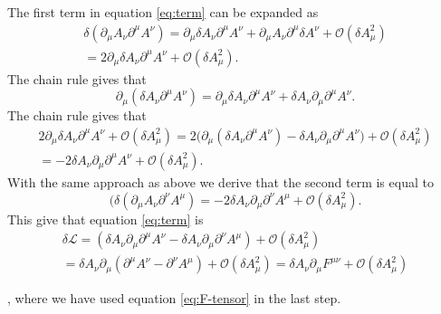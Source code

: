 The first term in equation \ref{eq:term} can be expanded as 
\begin{gather*}
\delta(\partial_\mu A_\nu \partial^\mu A^\nu)=\partial_\mu \delta A_\nu \partial^\mu A^\nu+ \partial_\mu A_\nu \partial^\mu \delta A^\nu+ \mathcal{O}(\delta A^2_\mu)\\=2\partial_\mu \delta A_\nu \partial^\mu A^\nu+\mathcal{O}(\delta A^2_\mu).
\label{eq:delta}
\end{gather*}
The chain rule gives that 
\[
\partial _\mu (\delta A_\nu \partial ^\mu A^\nu)= \partial_\mu \delta A_\nu \partial^\mu A^\nu +  \delta A_\nu \partial_\mu \partial^\mu A^\nu
. 
\]
The chain rule gives that
\begin{gather*}
2\partial_\mu \delta A_\nu \partial^\mu A^\nu+\mathcal{O}(\delta A^2_\mu)=2\big(\partial _\mu (\delta A_\nu \partial ^\mu A^\nu)-\delta A_\nu \partial_\mu \partial^\mu A^\nu\big)+\mathcal{O}(\delta A^2_\mu)\\=-2 \delta A_\nu \partial_\mu \partial^\mu A^\nu +\mathcal{O}(\delta A^2_\mu).
\end{gather*}
With the same approach as above we derive that the second term is equal to
\[
(\delta(\partial_\mu A_\nu \partial^\nu A^\mu)=-2 \delta A_\nu \partial_\mu \partial ^\nu A^\mu +  \mathcal{O}(\delta A^2_\mu).
\]
This give that equation \ref{eq:term} is 
\begin{gather*}
\delta \mathcal{L}=(\delta A_\nu \partial_\mu \partial^\mu A^\nu -\delta A_\nu \partial_\mu \partial ^\nu A^\mu)+\mathcal{O}(\delta A^2_\mu)\\=
\delta A_\nu \partial_\mu( \partial^\mu A^\nu- \partial ^\nu A^\mu) +\mathcal{O}(\delta A^2_\mu)=\delta A_\nu \partial_\mu F^{\mu \nu}+ \mathcal{O}(\delta A^2_\mu)
\end{gather*}

, where we have used equation \ref{eq:F-tensor} in the last step. 
